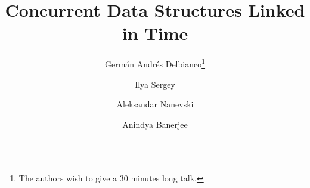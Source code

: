 \documentclass[11pt,letterpaper]{article}
\begin{document}
\title{Concurrent Data Structures Linked in Time}

\author[1]{Germ\'{a}n Andr\'{e}s Delbianco\thanks{The authors wish to
    give a 30 minutes long talk.}}
\author[2]{Ilya Sergey}
\author[1]{Aleksandar Nanevski} \author[1]{Anindya Banerjee}

\date{}



\maketitle

\begin{abstract}

\end{abstract}


%
%
%
%
%
%
%


\end{document}
